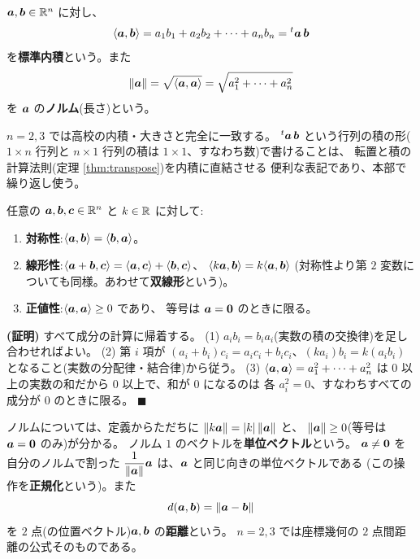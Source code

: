 \begin{teigi}[標準内積とノルム]\label{def:inner-std}
$\bm{a}, \bm{b} \in \mathbb{R}^n$ に対し、
\[
\langle \bm{a}, \bm{b} \rangle
= a_1 b_1 + a_2 b_2 + \cdots + a_n b_n = {}^t\bm{a}\,\bm{b}
\]
を\textbf{標準内積}という。また
\[
\| \bm{a} \| = \sqrt{\langle \bm{a}, \bm{a} \rangle}
= \sqrt{a_1^2 + \cdots + a_n^2}
\]
を $\bm{a}$ の\textbf{ノルム}(長さ)という。
\end{teigi}

$n = 2, 3$ では高校の内積・大きさと完全に一致する。
${}^t\bm{a}\,\bm{b}$ という行列の積の形($1 \times n$ 行列と
$n \times 1$ 行列の積は $1 \times 1$、すなわち数)で書けることは、
転置と積の計算法則(定理 \ref{thm:transpose})を内積に直結させる
便利な表記であり、本部で繰り返し使う。

\begin{teiri}[内積の基本性質]\label{thm:inner-props}
任意の $\bm{a}, \bm{b}, \bm{c} \in \mathbb{R}^n$ と $k \in \mathbb{R}$ に対して:
\begin{enumerate}
\item \textbf{対称性}:$\langle \bm{a}, \bm{b} \rangle = \langle \bm{b}, \bm{a} \rangle$。
\item \textbf{線形性}:$\langle \bm{a} + \bm{b}, \bm{c} \rangle
= \langle \bm{a}, \bm{c} \rangle + \langle \bm{b}, \bm{c} \rangle$、
$\langle k\bm{a}, \bm{b} \rangle = k\langle \bm{a}, \bm{b} \rangle$
(対称性より第 $2$ 変数についても同様。あわせて\textbf{双線形}という)。
\item \textbf{正値性}:$\langle \bm{a}, \bm{a} \rangle \ge 0$ であり、
等号は $\bm{a} = \bm{0}$ のときに限る。
\end{enumerate}
\end{teiri}

\noindent\textbf{(証明)}\quad
すべて成分の計算に帰着する。
(1) $a_i b_i = b_i a_i$(実数の積の交換律)を足し合わせればよい。
(2) 第 $i$ 項が $(a_i + b_i)c_i = a_ic_i + b_ic_i$、$(ka_i)b_i = k(a_ib_i)$
となること(実数の分配律・結合律)から従う。
(3) $\langle \bm{a}, \bm{a} \rangle = a_1^2 + \cdots + a_n^2$ は
$0$ 以上の実数の和だから $0$ 以上で、和が $0$ になるのは
各 $a_i^2 = 0$、すなわちすべての成分が $0$ のときに限る。 $\blacksquare$

ノルムについては、定義からただちに
$\|k\bm{a}\| = |k|\,\|\bm{a}\|$ と、
$\|\bm{a}\| \ge 0$(等号は $\bm{a} = \bm{0}$ のみ)が分かる。
ノルム $1$ のベクトルを\textbf{単位ベクトル}という。
$\bm{a} \neq \bm{0}$ を自分のノルムで割った
$\dfrac{1}{\|\bm{a}\|}\bm{a}$ は、$\bm{a}$ と同じ向きの単位ベクトルである
(この操作を\textbf{正規化}という)。また
\[
d(\bm{a}, \bm{b}) = \|\bm{a} - \bm{b}\|
\]
を $2$ 点(の位置ベクトル)$\bm{a}, \bm{b}$ の\textbf{距離}という。
$n = 2, 3$ では座標幾何の $2$ 点間距離の公式そのものである。

